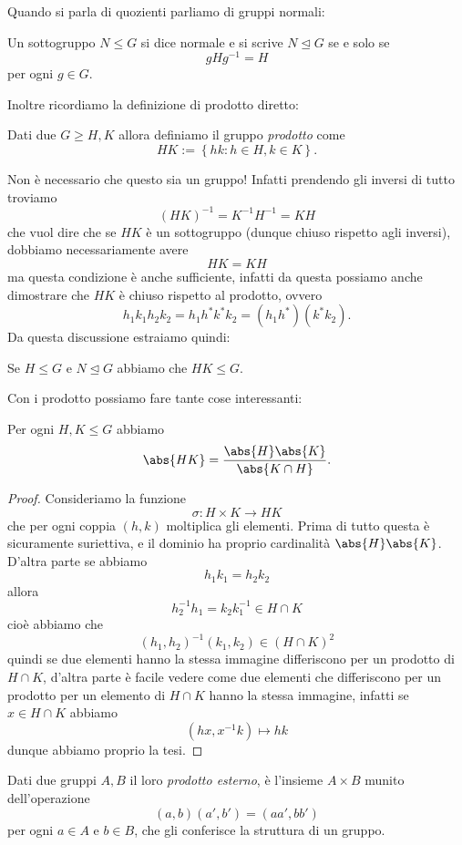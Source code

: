 \documentclass[11pt]{scrartcl}
\newcommand{\normal}{\mathrel{\unlhd}}
\begin{document}
	Quando si parla di quozienti parliamo di gruppi normali:
	\begin{definition}
		Un sottogruppo $N\le G$ si dice normale e si scrive $N\normal G$ se e solo se 
		$$gHg^{-1}=H$$
		per ogni $g\in G$.
	\end{definition}
	Inoltre ricordiamo la definizione di prodotto diretto:
	\begin{definition}
		Dati due $G\ge H,K$ allora definiamo il gruppo \textit{prodotto} come
		$$HK:=\left\{hk:h\in H, k\in K\right\}.$$
	\end{definition}
	Non è necessario che questo sia un gruppo! Infatti prendendo gli inversi di tutto troviamo
	$$\left(HK\right)^{-1}=K^{-1}H^{-1}=KH$$
	che vuol dire che se $HK$ è un sottogruppo (dunque chiuso rispetto agli inversi), dobbiamo necessariamente avere
	$$HK=KH$$
	ma questa condizione è anche sufficiente, infatti da questa possiamo anche dimostrare che $HK$ è chiuso rispetto al prodotto, ovvero
	$$h_1k_1h_2k_2=h_1h^*k^*k_2=(h_1h^*)(k^*k_2).$$
	Da questa discussione estraiamo quindi:
	\begin{corollary}
		Se $H\le G$ e $N\normal G$ abbiamo che $HK\le G$.
	\end{corollary}
	Con i prodotto possiamo fare tante cose interessanti:
	\begin{proposition}
		Per ogni $H,K\le G$ abbiamo
		$$\abs{HK}=\frac{\abs{H}\abs{K}}{\abs{K\cap H}}.$$
	\end{proposition}
	\begin{proof}
		Consideriamo la funzione 
		$$\sigma : H\times K \to HK$$
		che per ogni coppia $(h,k)$ moltiplica gli elementi. Prima di tutto questa è sicuramente suriettiva, e il dominio ha proprio cardinalità $\abs{H}\abs{K}$. D'altra parte se abbiamo
		$$h_1k_1=h_2k_2$$
		allora
		$$h_2^{-1}h_1=k_2k_1^{-1}\in H\cap K$$
		cioè abbiamo che 
		$$(h_1,h_2)^{-1}(k_1,k_2)\in (H\cap K)^2 $$
		quindi se due elementi hanno la stessa immagine differiscono per un prodotto di $H\cap K$, d'altra parte è facile vedere come due elementi che differiscono per un prodotto per un elemento di $H\cap K$ hanno la stessa immagine, infatti se $x\in H\cap K$ abbiamo
		$$(hx,x^{-1}k)\mapsto hk$$
		dunque abbiamo proprio la tesi.
	\end{proof}
	\begin{definition}
		Dati due gruppi $A,B$ il loro \textit{prodotto esterno}, è l'insieme $A\times B$ munito dell'operazione
		$$(a,b)(a',b')=(aa',bb')$$
		per ogni $a\in A$ e $b\in B$, che gli conferisce la struttura di un gruppo. 
	\end{definition}
\end{document}
